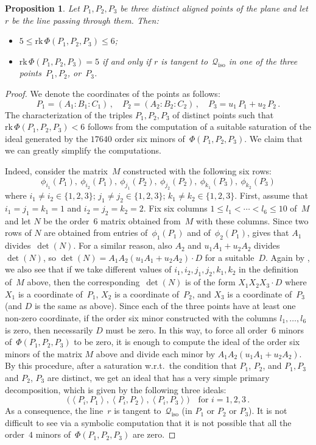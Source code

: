 \documentclass{amsart}
\theoremstyle{plain}
\newtheorem{prop}[lemma]{Proposition}
\theoremstyle{definition}
\newcommand{\iso}{\mathcal{Q}_{\mathrm{iso}}}
\newcommand{\scl}[2]{\left\langle {#1}, {#2} \right\rangle}
\newcommand{\rk}{\ensuremath{\mathrm{rk}}}
\begin{document}
\begin{prop}
\label{proposition:three_aligned_ranks}
Let $P_1, P_2, P_3$ be three distinct aligned points of the plane and let
$r$ be the line passing through them. Then:
%
\begin{itemize}
  \item $5 \leq \rk \,\Phi(P_1, P_2, P_3) \leq 6$;
  \item $\rk \,\Phi(P_1, P_2, P_3) = 5$ if and only if $r$ is tangent to~$\iso$ in one of the three points~$P_1, P_2$, or~$P_3$.
\end{itemize}
%
\end{prop}
\begin{proof} We denote the coordinates of the points as follows:
%
\[
  P_1 = (A_1: B_1: C_1) \,, \quad
  P_2 = (A_2: B_2: C_2) \,, \quad
  P_3 = u_1 \, P_1 + u_2 \, P_2 \,.
\]
%
The characterization of the triples $P_1, P_2, P_3$ of distinct points such that $\rk \,\Phi(P_1, P_2, P_3) < 6$ follows from the computation of a suitable saturation of the ideal generated by the $17640$ order six minors of~$\Phi(P_1, P_2, P_3)$.
We claim that we can greatly simplify the computations.

Indeed, consider the matrix~$M$ constructed with the following six rows:
%
\[
  \phi_{i_1}(P_1), \ \phi_{i_2}(P_1), \
  \phi_{j_1}(P_2),\ \phi_{j_2}(P_2), \
  \phi_{k_1}(P_3), \ \phi_{k_2}(P_3)
\]
%
where $i_1 \not= i_2 \in \{1, 2, 3\}$; $j_1 \not= j_2 \in \{1, 2, 3\}$;
$k_1 \not= k_2 \in \{1, 2, 3\}$.
First, assume that $i_1=j_1=k_1=1$ and $i_2=j_2=k_2=2$.
Fix six columns $1\leq l_1 < \cdots < l_6 \leq 10$ of~$M$ and let $N$ be the order~$6$ matrix obtained from~$M$ with these columns.
Since two rows of $N$ are obtained from
entries of~$\phi_1(P_1)$ and of~$\phi_2(P_1)$,
\Cref{lemma:minors} gives that $A_1$ divides~$\det(N)$. For a similar
reason, also $A_2$ and $u_1A_1+u_2A_2$ divides~$\det(N)$, so
$\det(N) = A_1A_2(u_1A_1+u_2A_2)\cdot D$ for a suitable~$D$.
Again by \Cref{lemma:minors}, we also see that if we take different values of $i_1, i_2, j_1, j_2, k_1, k_2$ in the definition of~$M$ above, then
the corresponding~$\det(N)$ is of the form $X_1X_2X_3\cdot D$ where
$X_1$ is a coordinate of~$P_1$, $X_2$ is a coordinate of~$P_2$, and $X_3$ is
a coordinate of~$P_3$ (and $D$ is the same as above).
Since each of the three
points have at least one non-zero coordinate, if the order six minor
constructed with the columns $l_1, \dots, l_6$ is zero, then necessarily $D$
must be zero. In this way, to force all order~$6$ minors of~$\Phi(P_1, P_2, P_3)$ to be zero, it is enough to compute the
ideal of the order six minors of the matrix $M$ above and divide each
minor by $A_1A_2(u_1A_1+u_2A_2)$. By this procedure, after
a saturation w.r.t.\ the condition that $P_1$, $P_2$, and $P_1, P_3$ and
$P_2$, $P_3$ are distinct, we get an ideal that has
a very simple primary decomposition, which is given by the following three
ideals:
%
\[
  \bigl( \scl{P_i}{P_1}, \scl{P_i}{P_2}, \scl{P_i}{P_3} \bigr) \quad
  \mbox{for } i = 1, 2, 3 \,.
\]
%
As a consequence, the line~$r$ is tangent to~$\iso$
(in $P_1$ or $P_2$ or $P_3$).
It is not difficult to see via a symbolic computation that it is not possible that all the order~$4$ minors of~$\Phi(P_1, P_2, P_3)$ are zero.
\end{proof}
\end{document}
